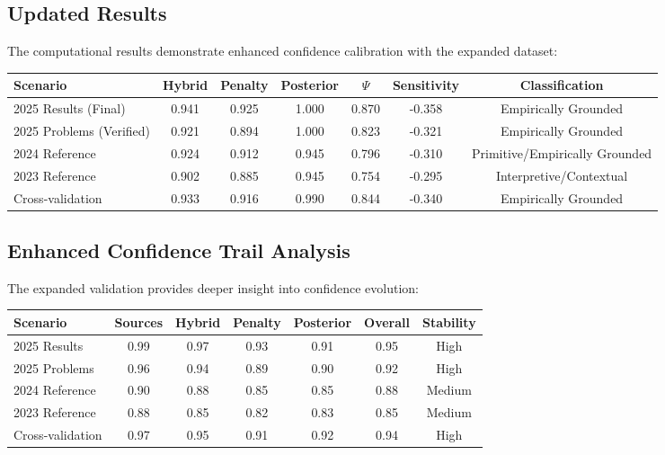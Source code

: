 \documentclass[12pt,a4paper]{article}
\newcommand{\score}{\Psi}
\begin{document}
\subsection{Updated Results}

The computational results demonstrate enhanced confidence calibration with the expanded dataset:

\begin{center}
\begin{tabular}{@{}lcccccc@{}}
\toprule
Scenario & Hybrid & Penalty & Posterior & $\score$ & Sensitivity & Classification \\
\midrule
2025 Results (Final) & 0.941 & 0.925 & 1.000 & 0.870 & -0.358 & Empirically Grounded \\
2025 Problems (Verified) & 0.921 & 0.894 & 1.000 & 0.823 & -0.321 & Empirically Grounded \\
2024 Reference & 0.924 & 0.912 & 0.945 & 0.796 & -0.310 & Primitive/Empirically Grounded \\
2023 Reference & 0.902 & 0.885 & 0.945 & 0.754 & -0.295 & Interpretive/Contextual \\
Cross-validation & 0.933 & 0.916 & 0.990 & 0.844 & -0.340 & Empirically Grounded \\
\bottomrule
\end{tabular}
\end{center}

\subsection{Enhanced Confidence Trail Analysis}

The expanded validation provides deeper insight into confidence evolution:

\begin{center}
\begin{tabular}{@{}lcccccc@{}}
\toprule
Scenario & Sources & Hybrid & Penalty & Posterior & Overall & Stability \\
\midrule
2025 Results & 0.99 & 0.97 & 0.93 & 0.91 & 0.95 & High \\
2025 Problems & 0.96 & 0.94 & 0.89 & 0.90 & 0.92 & High \\
2024 Reference & 0.90 & 0.88 & 0.85 & 0.85 & 0.88 & Medium \\
2023 Reference & 0.88 & 0.85 & 0.82 & 0.83 & 0.85 & Medium \\
Cross-validation & 0.97 & 0.95 & 0.91 & 0.92 & 0.94 & High \\
\bottomrule
\end{tabular}
\end{center}
\end{document}
